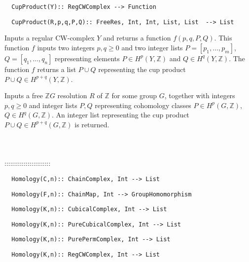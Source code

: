 \documentclass[a4paper,11pt]{report}
\begin{document}
{\begin{verbatim}  CupProduct(Y):: RegCWComplex --> Function
\end{verbatim}
 
\begin{verbatim}  CupProduct(R,p,q,P,Q):: FreeRes, Int, Int, List, List  --> List
\end{verbatim}


 

 Inputs a regular CW-complex $Y$ and returns a function $f(p,q,P,Q)$. This function $f$ inputs two integers $p,q \ge 0$ and two integer lists $P=[p_1, \ldots, p_m]$, $Q=[q_1, \ldots, q_n]$ representing elements $P\in H^p(Y,\mathbb Z)$ and $Q\in H^q(Y,\mathbb Z)$. The function $f$ returns a list $P \cup Q$ representing the cup product $P \cup Q \in H^{p+q}(Y,\mathbb Z)$. 

 Inputs a free $\mathbb ZG$ resolution $R$ of $\mathbb Z$ for some group $G$, together with integers $p,q \ge 0$ and integer lists $P, Q$ representing cohomology classes $P\in H^p(G,\mathbb Z)$, $Q\in H^q(G,\mathbb Z)$. An integer list representing the cup product $P\cup Q \in H^{p+q}(G,\mathbb Z)$ is returned. \\
 \\
 \\
 \\
 ::::::::::::::::::::::::\\
 
\begin{verbatim}  Homology(C,n):: ChainComplex, Int --> List
\end{verbatim}
 
\begin{verbatim}  Homology(F,n):: ChainMap, Int --> GroupHomomorphism
\end{verbatim}
 
\begin{verbatim}  Homology(K,n):: CubicalComplex, Int --> List
\end{verbatim}
 
\begin{verbatim}  Homology(K,n):: PureCubicalComplex, Int --> List
\end{verbatim}
 
\begin{verbatim}  Homology(K,n):: PurePermComplex, Int --> List
\end{verbatim}
 
\begin{verbatim}  Homology(K,n):: RegCWComplex, Int --> List
\end{verbatim}
 
}
\end{document}
